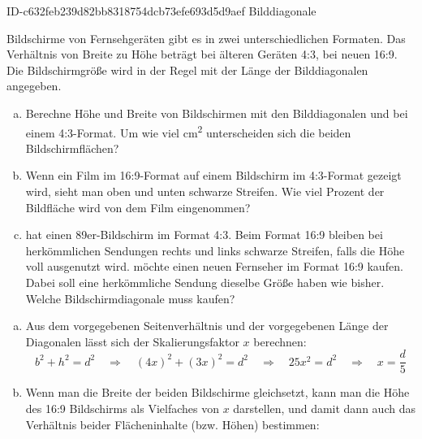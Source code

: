 \begin{exercise}
      {ID-c632feb239d82bb8318754dcb73efe693d5d9aef}
      {Bilddiagonale}
  \ifproblem\problem\par
    Bildschirme von Fernsehgeräten gibt es in zwei unterschiedlichen Formaten.
    Das Verhältnis von Breite zu Höhe beträgt bei älteren Geräten 4:3, bei
    neuen 16:9. Die Bildschirmgröße wird in der Regel mit der Länge der
    Bilddiagonalen angegeben.
    \begin{enumerate}[a)]
      \item Berechne Höhe und Breite von Bildschirmen mit den Bilddiagonalen
             und  bei einem 4:3-Format. Um wie viel cm\textsuperscript{2}
            unterscheiden sich die beiden Bildschirmflächen?
      \item Wenn ein Film im 16:9-Format auf einem Bildschirm im 4:3-Format gezeigt
            wird, sieht man oben und unten schwarze Streifen. Wie viel Prozent der
            Bildfläche wird von dem Film eingenommen?
      \item \xxa{} hat einen \num{89}er-Bildschirm im Format 4:3. Beim Format 16:9 bleiben
            bei herkömmlichen Sendungen rechts und links schwarze Streifen, falls die Höhe
            voll ausgenutzt wird. \xxa{} möchte einen neuen Fernseher im Format
            16:9 kaufen. Dabei soll eine herkömmliche Sendung dieselbe Größe haben
            wie bisher. Welche Bildschirmdiagonale muss \xxa{} kaufen?
    \end{enumerate}
  \fi
  \ifoutline\outline\par
    \begin{enumerate}[a)]
      \item Aus dem vorgegebenen Seitenverhältnis und der vorgegebenen Länge
            der Diagonalen lässt sich der Skalierungsfaktor $x$ berechnen:
            \begin{equation*}
              b^2+h^2=d^2
              \quad\Rightarrow\quad
              (4x)^2+(3x)^2=d^2
              \quad\Rightarrow\quad
              25x^2=d^2
              \quad\Rightarrow\quad
              x = \frac{d}{5}
            \end{equation*}
      \item Wenn man die Breite der beiden Bildschirme gleichsetzt, kann man
            die Höhe des 16:9 Bildschirms als Vielfaches von $x$ darstellen, und
            damit dann auch das Verhältnis beider Flächeninhalte (bzw. Höhen) bestimmen:\par
            \begin{minipage}{6.25cm}

\end{minipage}
\end{enumerate}
\end{exercise}
